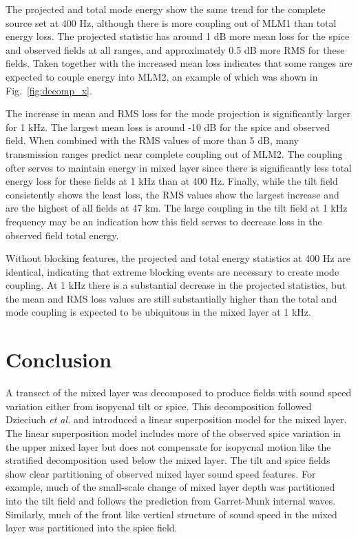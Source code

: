 \documentclass[preprint,NumberedRefs]{JASA}
\begin{document}
The projected and total mode energy show the same trend for the complete source set at 400 Hz, although there is more coupling out of MLM1 than total energy loss. The projected statistic has around 1 dB more mean loss for the spice and observed fields at all ranges, and approximately 0.5 dB more RMS for these fields. Taken together with the increased mean loss indicates that some ranges are expected to couple energy into MLM2, an example of which was shown in Fig.~\ref{fig:decomp_x}.

The increase in mean and RMS loss for the mode projection is significantly larger for 1 kHz. The largest mean loss is around -10 dB for the spice and observed field. When combined with the RMS values of more than 5 dB, many transmission ranges predict near complete coupling out of MLM2. The coupling ofter serves to maintain energy in mixed layer since there is significantly less total energy loss for these fields at 1 kHz than at 400 Hz. Finally, while the tilt field consistently shows the least loss, the RMS values show the largest increase and are the highest of all fields at 47 km. The large coupling in the tilt field at 1 kHz frequency may be an indication how this field serves to decrease loss in the observed field total energy.

Without blocking features, the projected and total energy statistics at 400 Hz are identical, indicating that extreme blocking events are necessary to create mode coupling. At 1 kHz there is a substantial decrease in the projected statistics, but the mean and RMS loss values are still substantially higher than the total and mode coupling is expected to be ubiquitous in the mixed layer at 1 kHz.

\section{Conclusion}\label{sec:conclusion}
A transect of the mixed layer was decomposed to produce fields with sound speed variation either from isopycnal tilt or spice. This decomposition followed Dzieciuch \emph{et al.}\citep{dzieciuch2004} and introduced a linear superposition model for the mixed layer. The linear superposition model includes more of the observed spice variation in the upper mixed layer but does not compensate for isopycnal motion like the stratified decomposition used below the mixed layer. The tilt and spice fields show clear partitioning of observed mixed layer sound speed features. For example, much of the small-scale change of mixed layer depth was partitioned into the tilt field and follows the prediction from Garret-Munk internal waves. Similarly, much of the front like vertical structure of sound speed in the mixed layer was partitioned into the spice field.
\end{document}
